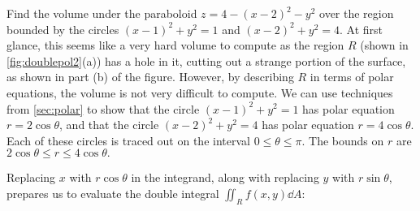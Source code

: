 \begin{example}\label{ex_doublepol2}%
Find the volume under the paraboloid $z=4-(x-2)^2-y^2$ over the region bounded by the circles $(x-1)^2+y^2=1$ and $(x-2)^2+y^2=4$.
\solution
At first glance, this seems like a very hard volume to compute as the region $R$ (shown in \autoref{fig:doublepol2}(a)) has a hole in it, cutting out a strange portion of the surface, as shown in part (b) of the figure. However, by describing $R$ in terms of polar equations, the volume is not very difficult to compute. We can use techniques from \autoref{sec:polar} to show that the circle $(x-1)^2+y^2=1$ has polar equation $r=2\cos\theta$, and that the circle $(x-2)^2+y^2=4$ has polar equation $r=4\cos\theta$. Each of these circles is traced out on the interval $0\leq\theta\leq\pi$. The bounds on $r$ are $2\cos\theta\leq r\leq 4\cos\theta.$ 

Replacing $x$ with $r\cos\theta$ in the integrand, along with replacing $y$ with $r\sin \theta$, prepares us to evaluate the double integral $\iint_Rf(x,y)\dd A$:


\end{example}

